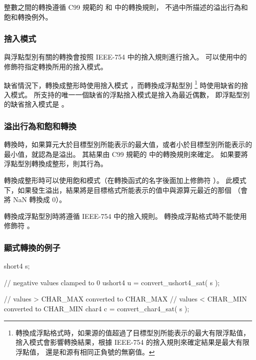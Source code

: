 整數之間的轉換遵循 C99 規範的{} 和{} 中的轉換規則，
不過中所描述的溢出行為和飽和轉換例外。

\subsubsection{捨入模式}

與浮點型別有關的轉換會按照 IEEE-754 中的捨入規則進行捨入。
可以使用中的修飾符指定轉換所用的捨入模式。

{}

缺省情況下，轉換成整形時使用捨入模式 ，而轉換成浮點型別
\footnote{轉換成浮點格式時，如果源的值超過了目標型別所能表示的最大有限浮點值，
捨入模式會影響轉換結果，根據 IEEE-754 的捨入規則來確定結果是最大有限浮點值，
還是和源有相同正負號的無窮值。}
時使用缺省的捨入模式。
所支持的唯一一個缺省的浮點捨入模式是捨入為最近偶數，
即浮點型別的缺省捨入模式是 。

\subsubsection[sec:oorbasc]{溢出行為和飽和轉換}

轉換時，如果算元大於目標型別所能表示的最大值，或者小於目標型別所能表示的最小值，就認為是溢出。
其結果由 C99 規範的{} 中的轉換規則來確定。
如果要將浮點型別轉換成整形，則其行為。

轉換成整形時可以使用飽和模式（在轉換函式的名字後面加上修飾符 ）。
此模式下，如果發生溢出，結果將是目標格式所能表示的值中與源算元最近的那個
（會將 NaN 轉換成 0）。

轉換成浮點型別時將遵循 IEEE-754 中的捨入規則。
轉換成浮點格式時不能使用修飾符 。

\subsubsection{顯式轉換的例子}

\startexample
\startclc
short4	s;

// negative values clamped to 0
ushort4	u = convert_ushort4_sat( s );

// values > CHAR_MAX converted to CHAR_MAX
// values < CHAR_MIN converted to CHAR_MIN
char4 c = convert_char4_sat( s );
\stopclc
\stopexample

